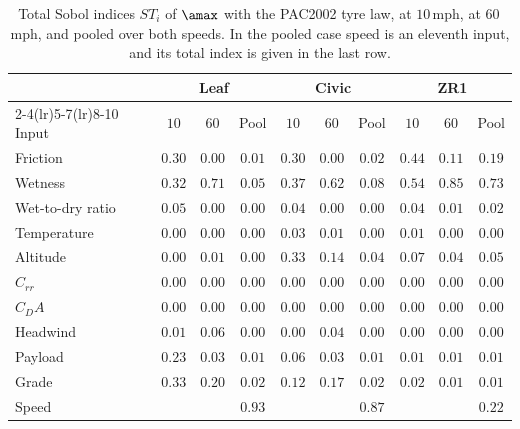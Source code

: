 \begin{table}[htbp]
\centering\small
\setlength{\tabcolsep}{4.2pt}
\caption{Total Sobol indices $ST_i$ of $\amax$ with the PAC2002 tyre law, at $10$\,mph, at $60$\,mph, and pooled over both speeds. In the pooled case speed is an eleventh input, and its total index is given in the last row.}\label{tab:sobol}
\begin{tabular}{lccccccccc}
\toprule
& \multicolumn{3}{c}{Leaf} & \multicolumn{3}{c}{Civic} & \multicolumn{3}{c}{ZR1}\\
\cmidrule(lr){2-4}\cmidrule(lr){5-7}\cmidrule(lr){8-10}
Input & $10$ & $60$ & Pool & $10$ & $60$ & Pool & $10$ & $60$ & Pool\\
\midrule
Friction & $0.30$ & $0.00$ & $0.01$ & $0.30$ & $0.00$ & $0.02$ & $0.44$ & $0.11$ & $0.19$\\
Wetness & $0.32$ & $0.71$ & $0.05$ & $0.37$ & $0.62$ & $0.08$ & $0.54$ & $0.85$ & $0.73$\\
Wet-to-dry ratio & $0.05$ & $0.00$ & $0.00$ & $0.04$ & $0.00$ & $0.00$ & $0.04$ & $0.01$ & $0.02$\\
Temperature & $0.00$ & $0.00$ & $0.00$ & $0.03$ & $0.01$ & $0.00$ & $0.01$ & $0.00$ & $0.00$\\
Altitude & $0.00$ & $0.01$ & $0.00$ & $0.33$ & $0.14$ & $0.04$ & $0.07$ & $0.04$ & $0.05$\\
$C_{rr}$ & $0.00$ & $0.00$ & $0.00$ & $0.00$ & $0.00$ & $0.00$ & $0.00$ & $0.00$ & $0.00$\\
$C_DA$ & $0.00$ & $0.00$ & $0.00$ & $0.00$ & $0.00$ & $0.00$ & $0.00$ & $0.00$ & $0.00$\\
Headwind & $0.01$ & $0.06$ & $0.00$ & $0.00$ & $0.04$ & $0.00$ & $0.00$ & $0.00$ & $0.00$\\
Payload & $0.23$ & $0.03$ & $0.01$ & $0.06$ & $0.03$ & $0.01$ & $0.01$ & $0.01$ & $0.01$\\
Grade & $0.33$ & $0.20$ & $0.02$ & $0.12$ & $0.17$ & $0.02$ & $0.02$ & $0.01$ & $0.01$\\
\midrule
Speed &  &  & $0.93$ &  &  & $0.87$ &  &  & $0.22$\\
\bottomrule
\end{tabular}
\end{table}
